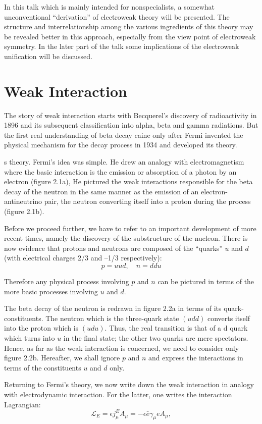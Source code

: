 In this talk which is mainly intended for nonspecialists, a somewhat unconventional “derivation” of electroweak theory will be presented. The structure and interrelationship among the various ingredients of this theory may be revealed better in this approach, especially from the view point of electroweak
symmetry. In the later part of the talk some implications of the electroweak unification will be discussed. 

\section{Weak Interaction}

The story of weak interaction starts with Becquerel’s discovery of radioactivity in 1896 and its subsequent
classification into alpha, beta and gamma radiations. But the first real understanding of beta decay caine only after Fermi invented the physical mechanism for the decay process in 1934 and developed
its theory. 

s theory.
Fermi’s idea was simple. He drew an analogy with electromagnetism where the basic interaction is the emission or absorption of a photon by an electron (figure 2.1a), He pictured the weak interactions
responsible for the beta decay of the neutron in the same manner as the emission of an
electron-antineutrino pair, the neutron converting itself into a proton during the process (figure 2.1b). 

Before we proceed further, we have to refer to an important development of more recent times,
namely the discovery of the substructure of the nucleon. There is now evidence that protons and
neutrons are composed of the “quarks” $u$ and $d$ (with electrical charges 2/3 and --1/3 respectively): 
$$
p=uud,\quad
n=ddu
$$

Therefore any physical process involving $p$ and $n$ can be pictured in terms of the more basic
processes involving $u$ and $d$.

The beta decay of the neutron is redrawn in figure 2.2a in terms of its quark-constituents. The
neutron which is the three-quark state $(udd)$ converts itself into the proton which is $(udu)$. Thus, the
real transition is that of a d quark which turns into $u$ in the final state; the other two quarks are
mere spectators. Hence, as far as the weak interaction is concerned, we need to consider only figure
2.2b. Hereafter, we shall ignore $p$ and $n$ and express the interactions in terms of the constituents $u$ and $d$ only. 

Returning to Fermi’s theory, we now write down the weak interaction in analogy with electrodynamic interaction. For the latter, one writes the interaction Lagrangian: 
\begin{equation*}
\mathcal{L}_{E}=\epsilon j_{\mu}^{E}A_{\mu}= - \epsilon \bar{e}\gamma_{\mu} e A_{\mu},\tag{2.1}
\end{equation*}

